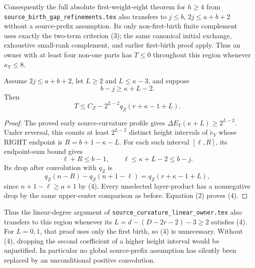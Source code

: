 Consequently the full absolute first-weight-eight theorem for
$h\ge4$ from \texttt{source\_birth\_gap\_refinements.tex} also
transfers to $j\le b$, $2j\le a+b+2$ without a source-prefix
assumption. Its only non-first-birth finite complement uses exactly
the two-term criterion (3); the same canonical initial exchange,
exhaustive small-rank complement, and earlier first-birth proof apply.
Thus an owner with at least four non-one parts has $T\le0$
throughout this region whenever $\kappa_Y\le8$.

\begin{proposition}
Assume $2j\le a+b+2$, let $L\ge2$ and $L\le\kappa-3$, and suppose
\[
                       b-j\ge\kappa+L-2.            \tag{4}
\]
Then
\[
 \boxed{T\le C_Z-2^{L-2}q_Z(r+\kappa-1+L).}         \tag{5}
\]
\end{proposition}
\begin{proof}
The proved early source-curvature profile gives
$\Delta E_Y(\kappa+L)\ge2^{L-2}$.
Under reversal, this counts at least $2^{L-2}$ distinct
height intervals of $\widetilde e_Y$ whose RIGHT endpoint is
$R=b+1-\kappa-L$. For each such interval $[\ell,R]$,
its endpoint-sum bound gives
\[
 \ell+R\le b-1,\qquad \ell\le\kappa+L-2\le b-j.
\]
Its drop after convolution with $q_Z$ is
\[
 q_Z(n-R)-q_Z(n+1-\ell)
    =q_Z(r+\kappa-1+L),
\]
since $n+1-\ell\ge a+1$ by (4). Every unselected
layer-product has a nonnegative drop by the same upper-center
comparison as before. Equation (2) proves (4).
\end{proof}

Thus the linear-degree argument of
\texttt{source\_curvature\_linear\_owner.tex} also transfers
to this region whenever its $L=d-(D-2r-2)-3\ge2$ satisfies (4).
For $L=0,1$, that proof uses only the first birth, so (4) is unnecessary.
Without (4), dropping the second coefficient of a higher height interval
would be unjustified. In particular no global source-prefix assumption
has silently been replaced by an unconditional positive convolution.

